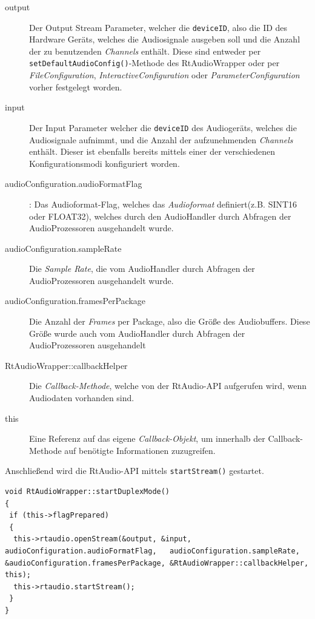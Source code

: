 \begin{description}
\item[output] Der Output Stream Parameter, welcher die \texttt{deviceID}, also die ID des Hardware Geräts, welches die Audiosignale ausgeben soll und die Anzahl der zu benutzenden \textit{Channels} enthält. Diese sind entweder per \texttt{setDefaultAudio\-Config()}-Methode des RtAudioWrapper oder per \textit{FileConfiguration}, \textit{InteractiveConfiguration} oder \textit{ParameterConfiguration} vorher festgelegt worden.
\item [input] Der Input Parameter welcher die \texttt{deviceID} des Audiogeräts, welches die Audiosignale aufnimmt, und die Anzahl der aufzunehmenden \textit{Channels} enthält. Dieser ist ebenfalls bereits mittels einer der verschiedenen Konfigurationsmodi konfiguriert worden.
\item [audioConfiguration.audioFormatFlag] : Das Audioformat-Flag, welches das \textit{Audioformat} definiert(z.B. SINT16 oder FLOAT32), welches durch den AudioHandler durch Abfragen der AudioProzessoren ausgehandelt wurde.
\item [audioConfiguration.sampleRate] Die \textit{Sample Rate}, die vom AudioHandler durch Abfragen der AudioProzessoren ausgehandelt wurde.
\item [audioConfiguration.framesPerPackage] Die Anzahl der \textit{Frames} per Package, also die Größe des Audiobuffers. Diese Größe wurde auch vom AudioHandler durch Abfragen der AudioProzessoren ausgehandelt
\item [RtAudioWrapper::callbackHelper] Die \textit{Callback-Methode}, welche von der RtAudio-API aufgerufen wird, wenn Audiodaten vorhanden sind.
\item [this] Eine Referenz auf das eigene \textit{Callback-Objekt}, um innerhalb der Callback-Methode auf benötigte Informationen zuzugreifen.
\end{description}

Anschließend wird die RtAudio-API mittels \texttt{startStream()} gestartet.

\begin{lstlisting}[caption={Start des Duplex Mode im RtAudioWrapper},label={Code:RtAudio DuplexMode}]
void RtAudioWrapper::startDuplexMode()
{
 if (this->flagPrepared)
 {
  this->rtaudio.openStream(&output, &input, audioConfiguration.audioFormatFlag,   audioConfiguration.sampleRate, &audioConfiguration.framesPerPackage, &RtAudioWrapper::callbackHelper, this);
  this->rtaudio.startStream();
 }
}
\end{lstlisting}

